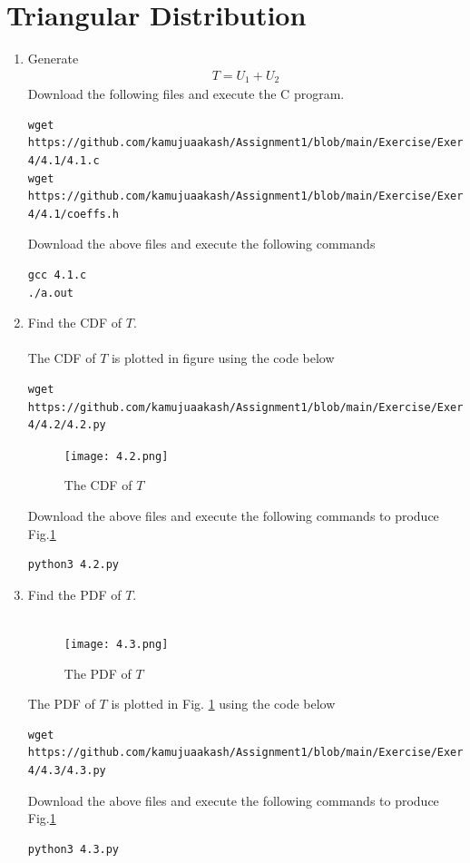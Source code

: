 \documentclass[journal,12pt,twocolumn]{IEEEtran}
\renewcommand\thesection{\arabic{section}}
\begin{document}
\section{Triangular Distribution}
\begin{enumerate}[label=\thesection.\arabic*
,ref=\thesection.\theenumi]
    \item Generate
    \begin{align}
        T=U_1+U_2
    \end{align}
    \solution Download the following files and execute the  C program.
\begin{lstlisting}
wget https://github.com/kamujuaakash/Assignment1/blob/main/Exercise/Exercise-4/4.1/4.1.c
wget https://github.com/kamujuaakash/Assignment1/blob/main/Exercise/Exercise-4/4.1/coeffs.h
\end{lstlisting}
Download the above files and execute the following commands
\begin{lstlisting}
gcc 4.1.c 
./a.out
\end{lstlisting}
\item Find the CDF of $T$.\\
\solution \\The CDF of $T$ is plotted in figure using the code below
\begin{lstlisting}
wget https://github.com/kamujuaakash/Assignment1/blob/main/Exercise/Exercise-4/4.2/4.2.py
\end{lstlisting}
\begin{figure}[!h]
\centering
\texttt{[image: 4.2.png]}
\caption{The CDF of $T$}
\label{fig:4.2}
\end{figure}
Download the above files and execute the following commands to produce Fig.\ref{fig:4.2}
\begin{lstlisting}
python3 4.2.py
\end{lstlisting}

\item Find the PDF of $T$.\\
\solution\\ 
\begin{figure}[!h]
\centering
\texttt{[image: 4.3.png]}
\caption{The PDF of $T$}
\label{fig:4.3}
\end{figure}
The PDF of $T$ is plotted in Fig. \ref{fig:4.2} using the code below
\begin{lstlisting}
wget https://github.com/kamujuaakash/Assignment1/blob/main/Exercise/Exercise-4/4.3/4.3.py
\end{lstlisting}
Download the above files and execute the following commands to produce Fig.\ref{fig:4.2}
\begin{lstlisting}
python3 4.3.py
\end{lstlisting}


\end{enumerate}
\end{document}

